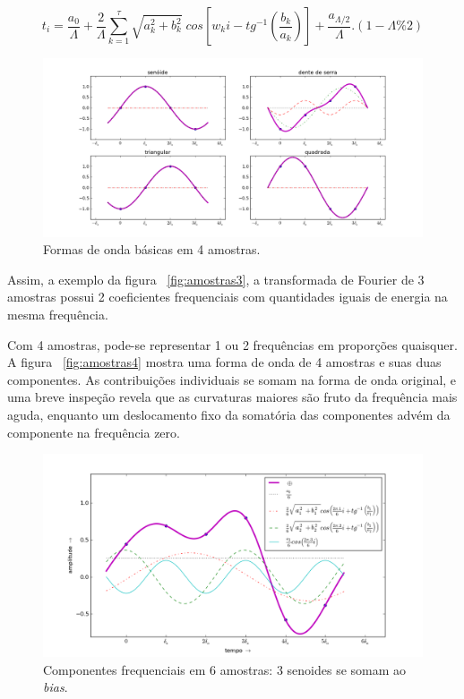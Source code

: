 \begin{equation}\label{eq:reconsCompleta}
t_i = \frac{a_0}{\Lambda} + \frac{2}{\Lambda}\sum_{k=1}^{\tau}\sqrt{a_k^2 + b_k^2} \; cos\left[w_k i - tg^{-1}\left(\frac{b_k}{a_k}\right)\right]+ \frac{ a_{\Lambda/2}}{\Lambda}.(1-\Lambda\% 2)
\end{equation}

\begin{figure}[h!]
    \centering
        \includegraphics[width=\textwidth]{figuras/amostras4formas__}
    \caption{Formas de onda básicas em 4 amostras.}
        \label{fig:formas4}
\end{figure}


Assim, a exemplo da figura ~\ref{fig:amostras3}, a transformada de Fourier de 3 amostras possui 2 coeficientes frequenciais com quantidades iguais de energia na mesma frequência.

Com 4 amostras, pode-se representar 1 ou 2 frequências em proporções quaisquer. A figura ~\ref{fig:amostras4} mostra uma 
forma de onda de 4 amostras e suas duas componentes. 
As contribuições individuais se somam na forma de onda 
original, e uma breve inspeção revela que as curvaturas maiores são fruto da frequência mais aguda,
enquanto um deslocamento fixo da somatória das componentes advém
da componente na frequência zero.
\begin{figure}[h!]
    \centering
        \includegraphics[width=\textwidth]{figuras/amostras6}
    \caption{Componentes frequenciais em 6 amostras: 3 senoides se somam ao \emph{bias}.}
        \label{fig:amostras6}
\end{figure}


